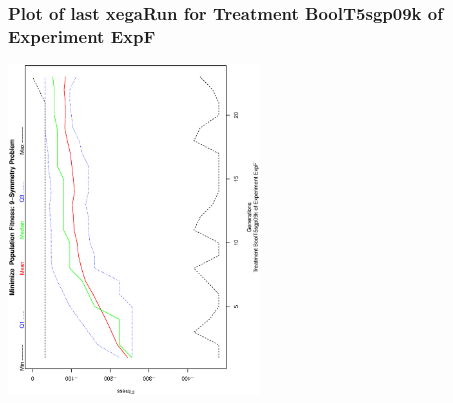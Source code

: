  \begin{frame}
 \frametitle{ Plot of last xegaRun for Treatment BoolT5sgp09k of Experiment ExpF }
 \begin{center}
\includegraphics[width=0.5\textwidth, angle=-90]
{ExpFPlotPopStatsFigure007.eps}
 \end{center}
 \label{report/ExpFPlotPopStatsFigure007.eps}  
 \end{frame}

